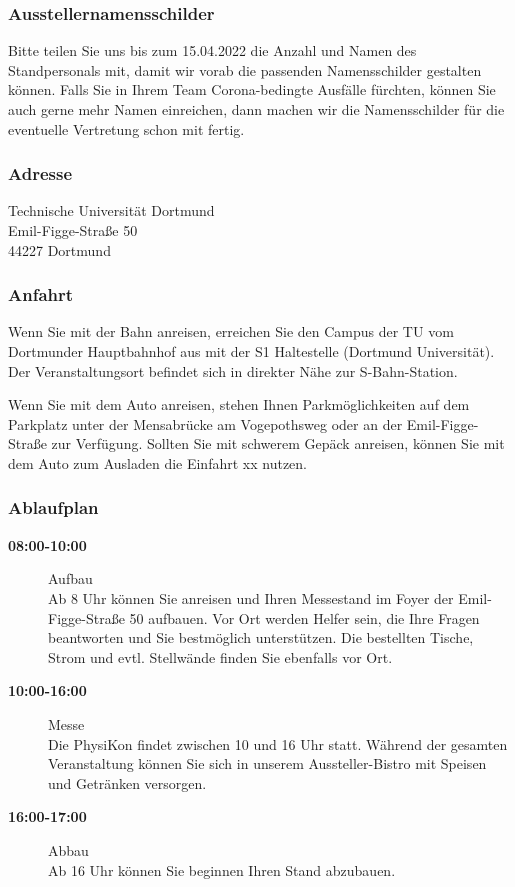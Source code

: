 \documentclass[
  paper=a4,
  fontsize=12pt,
  DIV=16,
  headheight=30pt,
  footheight=45pt,
  headinclude,
  parskip=half,
]{scrartcl}
\begin{document}
\subsubsection*{Ausstellernamensschilder}

Bitte teilen Sie uns bis zum 15.04.2022 die Anzahl und Namen des Standpersonals mit, damit wir vorab die passenden Namensschilder gestalten können.
Falls Sie in Ihrem Team Corona-bedingte Ausfälle fürchten, können Sie auch gerne mehr Namen einreichen, dann machen wir die Namensschilder für die eventuelle Vertretung schon mit fertig.

\subsubsection*{Adresse}

Technische Universität Dortmund\\
Emil-Figge-Straße 50\\
44227 Dortmund\\

\subsubsection*{Anfahrt}

Wenn Sie mit der Bahn anreisen, erreichen Sie den Campus der TU vom Dortmunder Hauptbahnhof aus mit der S1 Haltestelle (Dortmund Universität).
Der Veranstaltungsort befindet sich in direkter Nähe zur S-Bahn-Station.

Wenn Sie mit dem Auto anreisen, stehen Ihnen Parkmöglichkeiten auf dem Parkplatz unter der Mensabrücke am Vogepothsweg oder an der Emil-Figge-Straße zur Verfügung.
Sollten Sie mit schwerem Gepäck anreisen, können Sie mit dem Auto zum Ausladen die Einfahrt xx nutzen.


\subsubsection*{Ablaufplan}
\begin{description}
    \item[\textbf{08:00-10:00}] Aufbau\\
      Ab 8 Uhr können Sie anreisen und Ihren Messestand im Foyer der Emil-Figge-Straße 50 aufbauen.
      Vor Ort werden Helfer sein, die Ihre Fragen beantworten und Sie bestmöglich unterstützen.
      Die bestellten Tische, Strom und evtl. Stellwände finden Sie ebenfalls vor Ort.
    \item[\textbf{10:00-16:00}] Messe\\
      Die PhysiKon findet zwischen 10 und 16 Uhr statt.
      Während der gesamten Veranstaltung können Sie sich in unserem Aussteller-Bistro mit Speisen und Getränken versorgen.
    \item[\textbf{16:00-17:00}] Abbau\\
      Ab 16 Uhr können Sie beginnen Ihren Stand abzubauen.
  \end{description}
\end{document}
